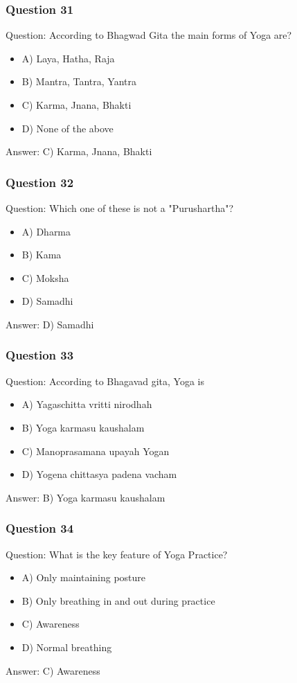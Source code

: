 \begin{frame}[fragile]\frametitle{Question 31}
Question: According to Bhagwad Gita the main forms of Yoga are?
\begin{itemize}
\item A) Laya, Hatha, Raja
\item B) Mantra, Tantra, Yantra
\item C) Karma, Jnana, Bhakti
\item D) None of the above
\end{itemize}
Answer: C) Karma, Jnana, Bhakti
\end{frame}

\begin{frame}[fragile]\frametitle{Question 32}
Question: Which one of these is not a "Purushartha"?
\begin{itemize}
\item A) Dharma
\item B) Kama
\item C) Moksha
\item D) Samadhi
\end{itemize}
Answer: D) Samadhi
\end{frame}

\begin{frame}[fragile]\frametitle{Question 33}
Question: According to Bhagavad gita, Yoga is
\begin{itemize}
\item A) Yagaschitta vritti nirodhah
\item B) Yoga karmasu kaushalam
\item C) Manoprasamana upayah Yogan
\item D) Yogena chittasya padena vacham
\end{itemize}
Answer: B) Yoga karmasu kaushalam
\end{frame}

\begin{frame}[fragile]\frametitle{Question 34}
Question: What is the key feature of Yoga Practice?
\begin{itemize}
\item A) Only maintaining posture
\item B) Only breathing in and out during practice
\item C) Awareness
\item D) Normal breathing
\end{itemize}
Answer: C) Awareness
\end{frame}

